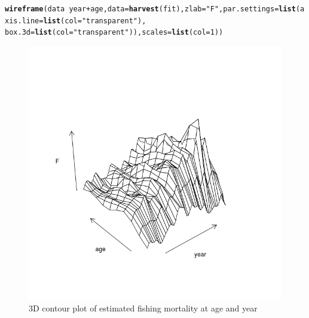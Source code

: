 \documentclass[a4paper,english,10pt]{article}\usepackage[]{graphicx}\usepackage[]{color}
\makeatletter
\def\maxwidth{ %
  \ifdim\Gin@nat@width>\linewidth
    \linewidth
  \else
    \Gin@nat@width
  \fi
}
\newcommand{\hlnum}[1]{\textcolor[rgb]{0.686,0.059,0.569}{#1}}%
\newcommand{\hlstr}[1]{\textcolor[rgb]{0.192,0.494,0.8}{#1}}%
\newcommand{\hlopt}[1]{\textcolor[rgb]{0,0,0}{#1}}%
\newcommand{\hlstd}[1]{\textcolor[rgb]{0.345,0.345,0.345}{#1}}%
\newcommand{\hlkwc}[1]{\textcolor[rgb]{0.333,0.667,0.333}{#1}}%
\newcommand{\hlkwd}[1]{\textcolor[rgb]{0.737,0.353,0.396}{\textbf{#1}}}%
\newenvironment{kframe}{%
 \def\at@end@of@kframe{}%
 \ifinner\ifhmode%
  \def\at@end@of@kframe{\end{minipage}}%
  \begin{minipage}{\columnwidth}%
 \fi\fi%
 \def\FrameCommand##1{\hskip\@totalleftmargin \hskip-\fboxsep
 \colorbox{shadecolor}{##1}\hskip-\fboxsep
     \hskip-\linewidth \hskip-\@totalleftmargin \hskip\columnwidth}%
 \MakeFramed {\advance\hsize-\width
   \@totalleftmargin\z@ \linewidth\hsize
   \@setminipage}}%
 {\par\unskip\endMakeFramed%
 \at@end@of@kframe}
\newenvironment{knitrout}{}{} %
\makeatother
\begin{document}
\begin{knitrout}
\color{fgcolor}\begin{kframe}
\begin{alltt}
\hlkwd{wireframe}\hlstd{(data} \hlopt{~} \hlstd{year} \hlopt{+} \hlstd{age,} \hlkwc{data} \hlstd{=} \hlkwd{harvest}\hlstd{(fit),} \hlkwc{zlab} \hlstd{=} \hlstr{"F"}\hlstd{,} \hlkwc{par.settings} \hlstd{=} \hlkwd{list}\hlstd{(}\hlkwc{axis.line} \hlstd{=} \hlkwd{list}\hlstd{(}\hlkwc{col} \hlstd{=} \hlstr{"transparent"}\hlstd{),}
    \hlkwc{box.3d} \hlstd{=} \hlkwd{list}\hlstd{(}\hlkwc{col} \hlstd{=} \hlstr{"transparent"}\hlstd{)),} \hlkwc{scales} \hlstd{=} \hlkwd{list}\hlstd{(}\hlkwc{col} \hlstd{=} \hlnum{1}\hlstd{))}
\end{alltt}
\end{kframe}\begin{figure}[H]

{\centering \includegraphics[width=\maxwidth]{figure/F-1} 

}

\caption[3D contour plot of estimated fishing mortality at age and year]{3D contour plot of estimated fishing mortality at age and year}\label{fig:F}
\end{figure}


\end{knitrout}
\end{document}
